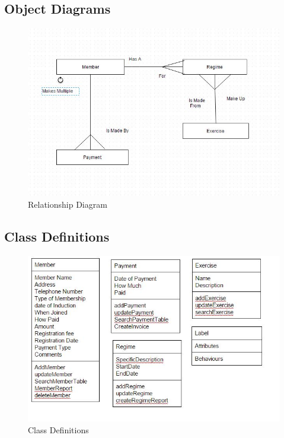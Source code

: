 \subsection{Object Diagrams}

\begin{figure}[H]
    \includegraphics[width=\textwidth]{RelationshipDiagram1.jpg}
    \caption{Relationship Diagram} \label{fig: Relationship Diagram}
\end{figure}

\subsection{Class Definitions}

\begin{figure}[H]
    \includegraphics[width=\textwidth]{NewClassDefs.JPG}
    \caption{Class Definitions} \label{fig:Class Definitions}
\end{figure}

